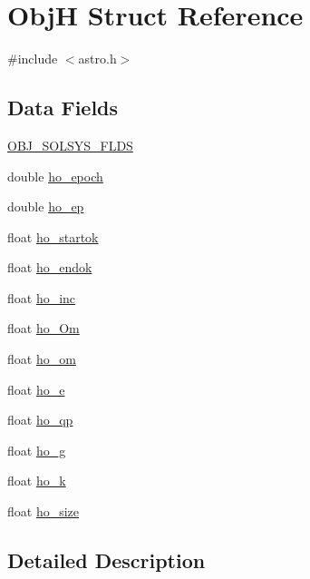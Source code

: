 \hypertarget{struct_obj_h}{\section{Obj\-H Struct Reference}
\label{struct_obj_h}
}


{\ttfamily \#include $<$astro.\-h$>$}

\subsection*{Data Fields}
\begin{DoxyCompactItemize}
\item 
\hyperlink{struct_obj_h_abb6e12c6ba111654831b0ace643d0e2c}{O\-B\-J\-\_\-\-S\-O\-L\-S\-Y\-S\-\_\-\-F\-L\-D\-S}
\item 
double \hyperlink{struct_obj_h_a2f0e63cb5deb63325a9df5488c1065c6}{ho\-\_\-epoch}
\item 
double \hyperlink{struct_obj_h_ad9185c53c71c2c98e49c888b72fbb716}{ho\-\_\-ep}
\item 
float \hyperlink{struct_obj_h_a09a9398b2a44b9a95d15284daa062da8}{ho\-\_\-startok}
\item 
float \hyperlink{struct_obj_h_a6058af1ea092b60bdc3e36c23429de3d}{ho\-\_\-endok}
\item 
float \hyperlink{struct_obj_h_ae6a3a975d680d5b55ffaa38cd2183476}{ho\-\_\-inc}
\item 
float \hyperlink{struct_obj_h_ad379f0625db7fcc67e51493110760de8}{ho\-\_\-\-Om}
\item 
float \hyperlink{struct_obj_h_a4a4312e20e35070f22625697e0da31ec}{ho\-\_\-om}
\item 
float \hyperlink{struct_obj_h_a71578b9d761dcb519aea89c67f87bf41}{ho\-\_\-e}
\item 
float \hyperlink{struct_obj_h_a89c7dcc10a5794cd1dc92c32a440433d}{ho\-\_\-qp}
\item 
float \hyperlink{struct_obj_h_a0d24d7f726f07bcbf17a8efd17d0fa52}{ho\-\_\-g}
\item 
float \hyperlink{struct_obj_h_a9c3656cdd0720d38c878fb01801e5fd5}{ho\-\_\-k}
\item 
float \hyperlink{struct_obj_h_a336096f873915f72ec8729ce4fe97623}{ho\-\_\-size}
\end{DoxyCompactItemize}


\subsection{Detailed Description}


